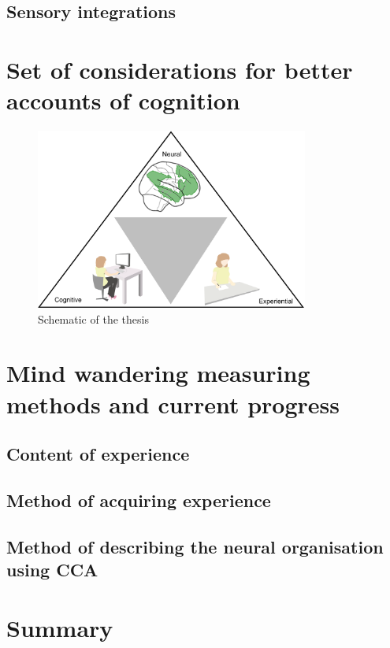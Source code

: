 \subsection{Sensory integrations}



\section{Set of considerations for better accounts of cognition}


\begin{figure}[H]
	\centering
	\includegraphics[width=0.8\textwidth]{chapters/img/thesisfig1.png}
	\caption{Schematic of the thesis} 
	\label{fig:thesis:fig1}
\end{figure}

\section{Mind wandering measuring methods and current progress}

\subsection{Content of experience}

\subsection{Method of acquiring experience}

\subsection{Method of describing the neural organisation using CCA}
\section{Summary}

